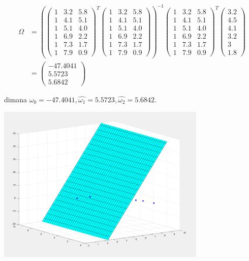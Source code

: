 \documentclass[12pt]{article}%
\begin{document}
\begin{enumerate}
\begin{enumerate}
			\begin{align*}
				\Omega & = \left ( \begin{pmatrix} 1 & 3.2 & 5.8\\ 1 & 4.1 & 5.1\\ 1 & 5.1 & 4.0\\ 1 & 6.9 & 2.2\\ 1 & 7.3 & 1.7\\ 1 & 7.9 & 0.9 \end{pmatrix} ^T \begin{pmatrix} 1 & 3.2 & 5.8\\ 1 & 4.1 & 5.1\\ 1 & 5.1 & 4.0\\ 1 & 6.9 & 2.2\\ 1 & 7.3 & 1.7\\ 1 & 7.9 & 0.9 \end{pmatrix} \right ) ^{-1} \begin{pmatrix} 1 & 3.2 & 5.8\\ 1 & 4.1 & 5.1\\ 1 & 5.1 & 4.0\\ 1 & 6.9 & 2.2\\ 1 & 7.3 & 1.7\\ 1 & 7.9 & 0.9 \end{pmatrix} ^T \begin{pmatrix} 3.2\\ 4.5\\ 4.1\\ 3.2\\ 3\\ 1.8 \end{pmatrix} \\
				& = \begin{pmatrix} -47.4041 \\ 5.5723 \\ 5.6842\end{pmatrix}
			\end{align*}

		\par dimana $\hat{\omega_0} = -47.4041,\hat{\omega_1} = 5.5723,\hat{\omega_2} = 5.6842$.

		\par \includegraphics[width=10cm]{ass2clo2fig6} 


\end{enumerate}
\end{enumerate}
\end{document}
